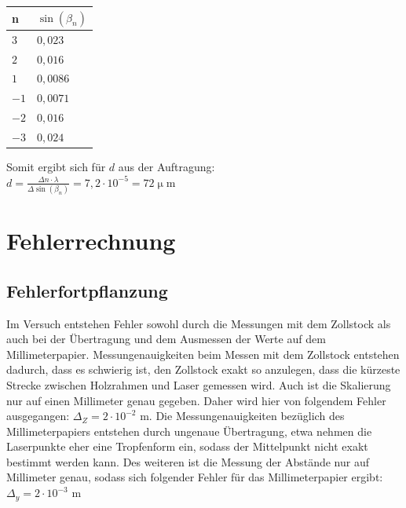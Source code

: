 \documentclass[12pt,a4paper,titlepage,headinclude,bibtotoc]{scrartcl}
\begin{document}
\begin{table} [h!]
\centering
\begin{tabular}{|p{4 cm}||p{4 cm}|}
        \hline
		n & $\sin(\beta_n)$ \\
         \hline 
         $3$ & $0,023$  \\
         \hline
         $2$ & $0,016$ \\
         \hline
         $1$ & $0,0086$\\
         \hline
         $-1$ & $0,0071$\\
         \hline
         $-2$ & $0,016$  \\
         \hline             
         $-3$ & $0,024$   \\
         \hline
\end{tabular}
\end{table}



Somit ergibt sich für $d$ aus der Auftragung:\\

$ d= \frac{\Delta n \cdot \lambda}{\Delta \sin(\beta_n)} = 7,2\cdot 10^{-5} = 72\upmu $m





\section{Fehlerrechnung}
\subsection{Fehlerfortpflanzung}
Im Versuch entstehen Fehler sowohl durch die Messungen mit dem Zollstock als auch bei der Übertragung und dem Ausmessen der Werte auf dem Millimeterpapier. Messungenauigkeiten beim Messen mit dem Zollstock entstehen dadurch, dass es schwierig ist, den Zollstock exakt so anzulegen, dass die kürzeste Strecke zwischen Holzrahmen und Laser gemessen wird. Auch ist die Skalierung nur auf einen Millimeter genau gegeben. Daher wird hier von folgendem Fehler ausgegangen: $\Delta_{Z}={2} \cdot{10^{-2}}$ m. Die Messungenauigkeiten bezüglich des Millimeterpapiers entstehen durch ungenaue Übertragung, etwa nehmen die Laserpunkte eher eine Tropfenform ein, sodass der Mittelpunkt nicht exakt bestimmt werden kann. Des weiteren ist die Messung der Abstände nur auf Millimeter genau, sodass sich folgender Fehler für das Millimeterpapier ergibt:\\
 $\Delta_{y}={2} \cdot {10^{-3}}$ m \\
\end{document}
